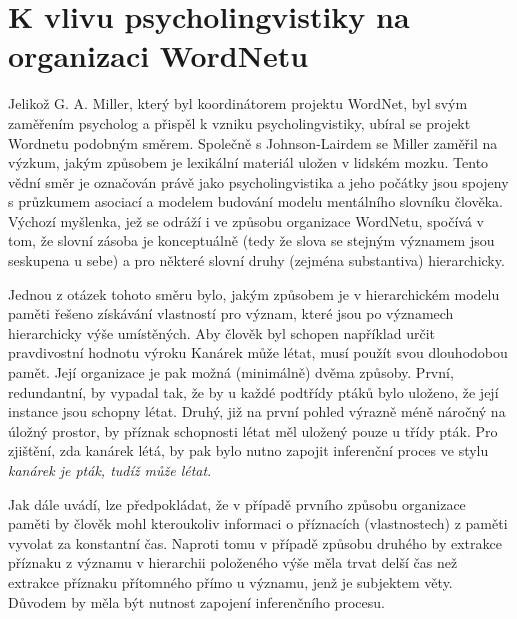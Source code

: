 \documentclass[a4paper, 11pt, oneside]{book}
\newcommand\ex{\textsf}
\begin{document}

			\section{K vlivu psycholingvistiky na organizaci WordNetu}
			\label{cha:psycho}

				Jelikož G. A. Miller, který byl koordinátorem projektu WordNet, byl svým zaměřením psycholog a přispěl k vzniku psycholingvistiky, ubíral se projekt Wordnetu podobným směrem. Společně s Johnson-Lairdem se Miller zaměřil na výzkum, jakým způsobem je lexikální materiál uložen v lidském mozku. Tento vědní směr je označován právě jako psycholingvistika a jeho počátky jsou spojeny s průzkumem asociací a modelem budování modelu mentálního slovníku člověka. Výchozí myšlenka, jež se odráží i ve způsobu organizace WordNetu, spočívá v tom, že slovní zásoba je konceptuálně (tedy že slova se stejným významem jsou seskupena u sebe) a pro některé slovní druhy (zejména substantiva) hierarchicky. 

				Jednou z otázek tohoto směru bylo, jakým způsobem je v hierarchickém modelu paměti řešeno získávání vlastností pro význam, které jsou  po významech hierarchicky výše umístěných. Aby člověk byl schopen například určit pravdivostní hodnotu výroku \ex{Kanárek může létat}, musí použít svou dlouhodobou pamět. Její organizace je pak možná (minimálně) dvěma způsoby. První, redundantní, by vypadal tak, že by u každé podtřídy ptáků bylo uloženo, že její instance jsou schopny létat. Druhý, již na první pohled výrazně méně náročný na úložný prostor, by příznak schopnosti létat měl uložený pouze u třídy \ex{pták}. Pro zjištění, zda kanárek létá, by pak bylo nutno zapojit inferenční proces ve stylu \textit{kanárek je pták, tudíž může létat}. \parencite{collins1969retrieval}

				Jak \textcite{collins1969retrieval} dále uvádí, lze předpokládat, že v případě prvního způsobu organizace paměti by člověk mohl kteroukoliv informaci o příznacích (vlastnostech) z paměti vyvolat za konstantní čas. Naproti tomu v případě způsobu druhého by extrakce příznaku z významu v hierarchii položeného výše měla trvat delší čas než extrakce příznaku přítomného přímo u významu, jenž je subjektem věty. Důvodem by měla být nutnost zapojení inferenčního procesu.
\end{document}
